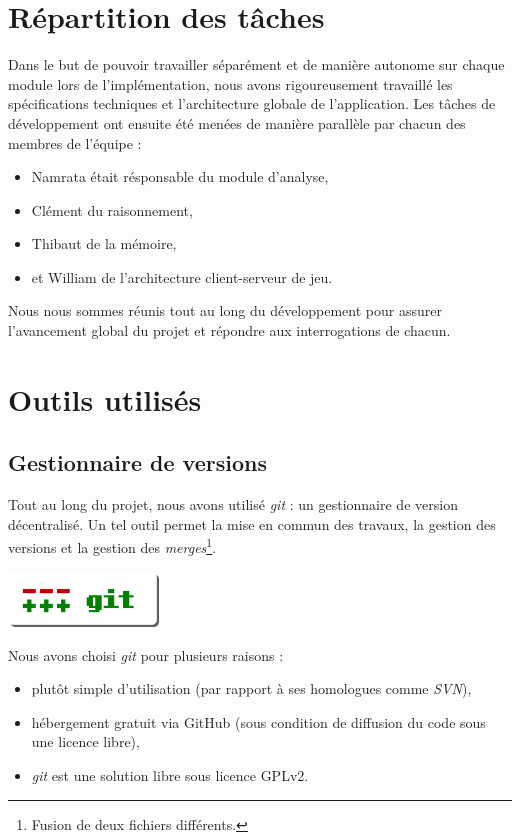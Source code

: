 \section{Répartition des tâches}

Dans le but de pouvoir travailler séparément et de manière autonome sur chaque module lors de l'implémentation, nous avons rigoureusement travaillé les spécifications techniques et l'architecture globale de l'application. Les tâches de développement ont ensuite été  menées de manière parallèle par chacun des membres de l'équipe :

\begin{itemize}
\item Namrata était résponsable du module d'analyse,
\item Clément du raisonnement,
\item Thibaut de la mémoire,
\item et William de l'architecture client-serveur de jeu.
\end{itemize}   

Nous nous sommes réunis tout au long du développement pour assurer l'avancement global du projet et répondre aux interrogations de chacun.

\section{Outils utilisés}

\subsection{Gestionnaire de versions}
Tout au long du projet, nous avons utilisé \emph{git} : un gestionnaire de version décentralisé. Un tel outil permet la mise en commun des travaux, la gestion des versions et la gestion des \emph{merges}\footnote{Fusion de deux fichiers différents.}. 

\begin{center}
	\includegraphics[width=0.3\textwidth]{files/outils/git}	
\end{center}

Nous avons choisi \emph{git} pour plusieurs raisons :

\begin{itemize}
\item plutôt simple d'utilisation (par rapport à ses homologues comme \emph{SVN}),
\item hébergement gratuit via GitHub (sous condition de diffusion du code sous une licence libre),
\item \emph{git} est une solution libre sous licence \gls{GPLv2}.
\end{itemize}

